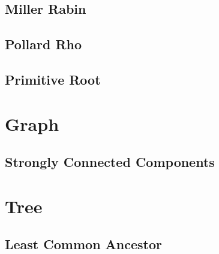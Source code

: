 \documentclass{article}
\begin{document}
\begin{multicols}{2}
    \subsection{Miller Rabin}
    
    \subsection{Pollard Rho}
    
    \subsection{Primitive Root}
    

    \section{Graph}
    \subsection{Strongly Connected Components}
    

    \section{Tree}
    \subsection{Least Common Ancestor}
    
\end{multicols}
\end{document}
